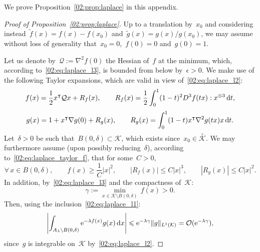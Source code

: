     \label{02:sec:proof_laplace}
    We prove Proposition~\ref{02:prop:laplace} in this appendix.
    \begin{proof}[Proof of Proposition~\ref{02:prop:laplace}]
            Up to a translation by~$x_0$ and considering instead~$\tilde f(x)=f(x)-f(x_0)$ and~$\tilde g(x)=g(x)/g(x_0)$, we may assume without loss of generality that~$x_0=0$,~$f(0) = 0$ and~$g(0)=1$.

            Let us denote by~$\mathcal Q := \nabla^2 f(0)$ the Hessian of~$f$ at the minimum, which, according to~\eqref{02:eq:laplace_l3}, is bounded from below by~$\epsilon>0$.
            We make use of the following Taylor expansions, which are valid in view of~\eqref{02:eq:laplace_l2}:
            \begin{equation}
                \label{02:eq:laplace_taylor_f}
                f(x) = \frac12 x^\intercal \mathcal Q x + R_f(x),\qquad R_f(x) = \frac12\int_0^1 (1-t)^2 D^3 f(tx):x^{\otimes 3} \,\mathrm{d} t,
            \end{equation}
            \begin{equation}
                \label{02:eq:laplace_taylor_g}
                g(x) = 1 + x^\intercal \nabla g(0) + R_g(x),\qquad R_g(x)=\int_0^1 (1-t) x^\intercal \nabla^2 g(tx)x\,\mathrm{d} t.
            \end{equation}
            Let~$\delta>0$ be such that~$B(0,\delta) \subset \mathcal K$, which exists since~$x_0\in\overset{\circ}{\mathcal K}$. We may furthermore assume (upon possibly reducing~$\delta$), according to~\eqref{02:eq:laplace_taylor_f}, that for some~$C>0$,
            \begin{equation}
                \label{02:eq:laplace_f_minorization}
                \forall\,x\in B(0,\delta),\qquad f(x) \geq \frac1C |x|^2,\qquad |R_f(x)| \leq C|x|^3,\qquad |R_g(x)| \leq C|x|^2.
            \end{equation}
            In addition, by~\eqref{02:eq:laplace_l3} and the compactness of~$\mathcal K$:
            \begin{equation}
                \label{02:eq:laplace_high_energyef_gamma}
                \gamma := \underset{x\in \mathcal K\setminus B(0,\delta)}{\min}\, f(x)> 0.
            \end{equation}
            Then, using the inclusion~\eqref{02:eq:laplace_l1}:
            \begin{equation}
                \left|\int_{A_\lambda \setminus B(0,\delta)} \mathrm{e}^{-\lambda f(x)}g(x)\,\mathrm{d} x\right| \leqslant \mathrm{e}^{-\lambda \gamma} \|g\|_{L^1(\mathcal K)} = \mathcal{O}(\mathrm{e}^{-\lambda\gamma}),
            \end{equation}
            since~$g$ is integrable on~$\mathcal K$ by~\eqref{02:eq:laplace_l2}.


\end{proof}
